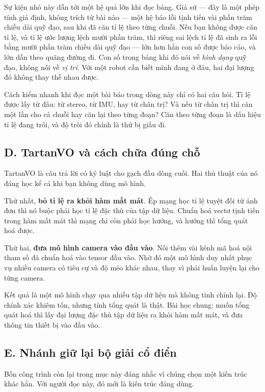 \documentclass[../../deep_learning.tex]{subfiles}
\begin{document}
Sự kiện nhỏ này dẫn tới một hệ quả lớn khi đọc bảng. Giả sử --- đây là một phép tính giả định, không trích từ bài nào --- một hệ báo lỗi tịnh tiến vài phần trăm chiều dài quỹ đạo, sau khi đã căn tỉ lệ theo từng chuỗi. Nếu bạn không được căn tỉ lệ, và tỉ lệ ước lượng lệch mười phần trăm, thì riêng sai lệch tỉ lệ đã sinh ra lỗi bằng mười phần trăm chiều dài quỹ đạo --- lớn hơn hẳn con số được báo cáo, và lớn dần theo quãng đường đi. Con số trong bảng khi đó nói về \emph{hình dạng} quỹ đạo, không nói về \emph{vị trí}. Với một robot cần biết mình đang ở đâu, hai đại lượng đó không thay thế nhau được.

Cách kiểm nhanh khi đọc một bài báo trong dòng này chỉ có hai câu hỏi. Tỉ lệ được lấy từ đâu: từ stereo, từ IMU, hay từ chân trị? Và nếu từ chân trị thì căn một lần cho cả chuỗi hay căn lại theo từng đoạn? Căn theo từng đoạn là dấu hiệu tỉ lệ đang trôi, và độ trôi đó chính là thứ bị giấu đi.

\subsection{D. TartanVO và cách chữa đúng chỗ}
TartanVO \cite{wang2021tartanvo} là câu trả lời có kỷ luật cho gạch đầu dòng cuối. Hai thủ thuật của nó đáng học kể cả khi bạn không dùng mô hình.

Thứ nhất, \textbf{bỏ tỉ lệ ra khỏi hàm mất mát}. Ép mạng học tỉ lệ tuyệt đối từ ảnh đơn thì nó buộc phải học tỉ lệ đặc thù của tập dữ liệu. Chuẩn hoá vectơ tịnh tiến trong hàm mất mát thì mạng chỉ còn phải học hướng, và hướng thì tổng quát hoá được.

Thứ hai, \textbf{đưa mô hình camera vào đầu vào}. Nối thêm vài kênh mã hoá nội tham số đã chuẩn hoá vào tensor đầu vào. Nhờ đó một mô hình duy nhất phục vụ nhiều camera có tiêu cự và độ méo khác nhau, thay vì phải huấn luyện lại cho từng camera.

Kết quả là một mô hình chạy qua nhiều tập dữ liệu mà không tinh chỉnh lại. Độ chính xác khiêm tốn, nhưng tính tổng quát là thật. Bài học chung: muốn tổng quát hoá thì lấy đại lượng đặc thù tập dữ liệu ra khỏi hàm mất mát, và đưa thông tin thiết bị vào đầu vào.

\subsection{E. Nhánh giữ lại bộ giải cổ điển}
Bốn công trình còn lại trong mục này đáng nhắc vì chúng chọn một kiến trúc khác hẳn. Với người đọc này, đó mới là kiến trúc đáng dùng.
\end{document}
